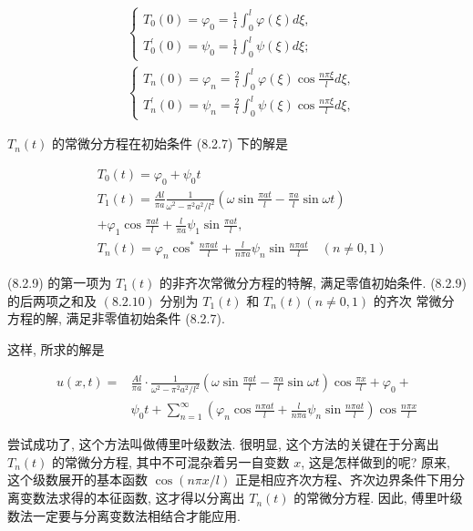 $$
\begin{aligned}
& \left\{\begin{array}{l}
T_{0}(0)=\varphi_{0}=\frac{1}{l} \int_{0}^{l} \varphi(\xi) d \xi, \\
T_{0}^{\prime}(0)=\psi_{0}=\frac{1}{l} \int_{0}^{l} \psi(\xi) d \xi ;
\end{array}\right. \\
& \left\{\begin{array}{l}
T_{n}(0)=\varphi_{n}=\frac{2}{l} \int_{0}^{l} \varphi(\xi) \cos \frac{n \pi \xi}{l} d \xi, \\
T_{n}^{\prime}(0)=\psi_{n}=\frac{2}{l} \int_{0}^{l} \psi(\xi) \cos \frac{n \pi \xi}{l} d \xi,
\end{array}\right.
\end{aligned}
$$

$T_{n}(t)$ 的常微分方程在初始条件 (8.2.7) 下的解是

$$
\begin{aligned}
& T_{0}(t)=\varphi_{0}+\psi_{0} t \\
& T_{1}(t)=\frac{A l}{\pi a} \frac{1}{\omega^{2}-\pi^{2} a^{2} / l^{2}}\left(\omega \sin \frac{\pi a t}{l}-\frac{\pi a}{l} \sin \omega t\right) \\
&+\varphi_{1} \cos \frac{\pi a t}{l}+\frac{l}{\pi a} \psi_{1} \sin \frac{\pi a t}{l}, \\
& T_{n}(t)=\varphi_{n} \cos ^{*} \frac{n \pi a t}{l}+\frac{l}{n \pi a} \psi_{n} \sin \frac{n \pi a t}{l} \quad(n \neq 0,1)
\end{aligned}
$$

(8.2.9) 的第一项为 $T_{1}(t)$ 的非齐次常微分方程的特解, 满足零值初始条件. (8.2.9) 的后两项之和及 $(8.2 .10)$ 分别为 $T_{1}(t)$ 和 $T_{n}(t)(n \neq 0,1)$ 的齐次
常微分方程的解, 满足非零值初始条件 (8.2.7).

这样, 所求的解是

$$
\begin{aligned}
u(x, t)= & \frac{A l}{\pi a} \cdot \frac{1}{\omega^{2}-\pi^{2} a^{2} / l^{2}}\left(\omega \sin \frac{\pi a t}{l}-\frac{\pi a}{l} \sin \omega t\right) \cos \frac{\pi x}{l}+\varphi_{0}+ \\
& \psi_{0} t+\sum_{n=1}^{\infty}\left(\varphi_{n} \cos \frac{n \pi a t}{l}+\frac{l}{n \pi a} \psi_{n} \sin \frac{n \pi a t}{l}\right) \cos \frac{n \pi x}{l}
\end{aligned}
$$

尝试成功了, 这个方法叫做傅里叶级数法. 很明显, 这个方法的关键在于分离出 $T_{n}(t)$ 的常微分方程, 其中不可混杂着另一自变数 $x$, 这是怎样做到的呢? 原来, 这个级数展开的基本函数 $\cos (n \pi x / l)$ 正是相应齐次方程、齐次边界条件下用分离变数法求得的本征函数, 这才得以分离出 $T_{n}(t)$ 的常微分方程. 因此, 傅里叶级数法一定要与分离变数法相结合才能应用.

